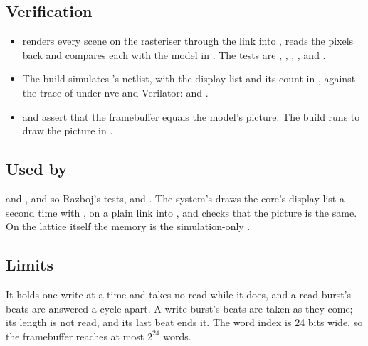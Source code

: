 \subsection*{Verification}

\begin{itemize}
\item {} renders every scene on the rasteriser
through the link into , reads the pixels back and compares
each with the model in . The tests are
,
,
,
\allowbreak{},
 and
.
\item The build simulates 's netlist, with the
display list and its count in , against the trace of
 under nvc and Verilator:
 and
.
\item {} and  assert that the
framebuffer equals the model's picture. The build runs
 to draw the picture in .
\end{itemize}

\subsection*{Used by}

 and , and so Razboj's
tests,  and . The system's
 draws the core's display list a second time with
, on a plain link into , and checks that the
picture is the same. On the lattice itself the memory is the
simulation-only .

\subsection*{Limits}

It holds one write at a time and takes no read while it does, and a
read burst's beats are answered a cycle apart. A write burst's beats
are taken as they come; its length is not read, and its last beat ends
it. The
word index is 24 bits wide, so the framebuffer reaches at most
$2^{24}$ words.
